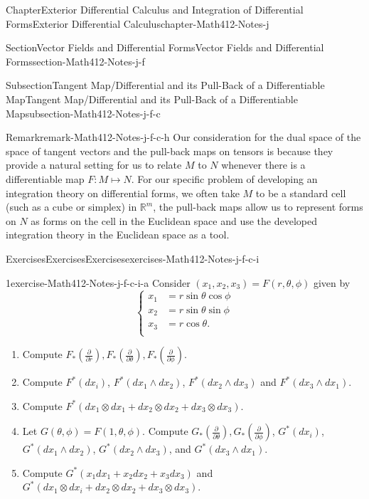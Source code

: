 \documentclass[oneside,10pt,]{book}
\numberwithin{equation}{section}
\newcommand{\bbR}{\mathbb{R}}
\newcommand{\amp}{&}
\begin{document}
\begin{chapterptx}{Chapter}{Exterior Differential Calculus and Integration of Differential Forms}{}{Exterior Differential Calculus}{}{}{chapter-Math412-Notes-j}
\begin{sectionptx}{Section}{Vector Fields and Differential Forms}{}{Vector Fields and Differential Forms}{}{}{section-Math412-Notes-j-f}
\begin{subsectionptx}{Subsection}{Tangent Map\slash{}Differential and its Pull-Back of a Differentiable Map}{}{Tangent Map\slash{}Differential and its Pull-Back of a Differentiable Map}{}{}{subsection-Math412-Notes-j-f-c}
\begin{remark}{Remark}{}{remark-Math412-Notes-j-f-c-h}
Our consideration for the dual space of the space of tangent vectors and the pull-back maps on tensors is because they provide a natural setting for us to relate \(M\) to \(N\) whenever there is a differentiable map \(F: M\mapsto N\).  For our specific problem of developing an integration theory on differential forms, we often take \(M\) to be a standard cell (such as a cube or simplex) in \(\bbR^{m}\), the pull-back maps allow us to represent forms on \(N\) as forms on the cell in the Euclidean space and use the developed integration theory in the Euclidean space as a tool.\end{remark}
%
%
\typeout{************************************************}
\typeout{************************************************}
%
\begin{exercises-subsubsection-numberless}{Exercises}{Exercises}{}{Exercises}{}{}{exercises-Math412-Notes-j-f-c-i}
\begin{divisionexercise}{1}{}{}{exercise-Math412-Notes-j-f-c-i-a}%
Consider \((x_{1}, x_{2}, x_{3})=F(r, \theta, \phi)\) given by%
\begin{equation*}
\begin{cases} x_{1} \amp = r\sin\theta\cos\phi \\
x_{2} \amp = r \sin\theta\sin\phi \\
x_{3} \amp = r \cos\theta.\\
\end{cases}
\end{equation*}
%
\begin{enumerate}[label=(\alph*)]
\item{}Compute \(F_{*}(\frac{\partial }{\partial r}), F_{*}(\frac{\partial }{\partial \theta}), 
F_{*}(\frac{\partial }{\partial \phi})\).%
\item{}Compute \(F^{*}(dx_{i})\), \(F^{*}(dx_{1}\wedge dx_{2})\), \(F^{*}(dx_{2}\wedge dx_{3})\) and \(F^{*}(dx_{3}\wedge dx_{1})\).%
\item{}Compute \(F^{*}(dx_{1}\otimes dx_{1}+ dx_{2}\otimes dx_{2}+dx_{3}\otimes dx_{3})\).%
\item{}Let \(G(\theta, \phi)=F(1, \theta, \phi)\). Compute \(G_{*}(\frac{\partial }{\partial \theta}), 
G_{*}(\frac{\partial }{\partial \phi})\), \(G^{*}(dx_{i})\), \(G^{*}(dx_{1}\wedge dx_{2})\), \(G^{*}(dx_{2}\wedge dx_{3})\), and \(G^{*}(dx_{3}\wedge dx_{1})\).%
\item{}Compute \(G^{*}(x_{1}dx_{1}+x_{2}dx_{2}+x_{3}dx_{3})\) and \(G^{*}(dx_{1}\otimes dx_{i}+ dx_{2}\otimes dx_{2}+dx_{3}\otimes dx_{3})\).%

\end{enumerate}
\end{divisionexercise}
\end{exercises-subsubsection-numberless}
\end{subsectionptx}
\end{sectionptx}
\end{chapterptx}
\end{document}
